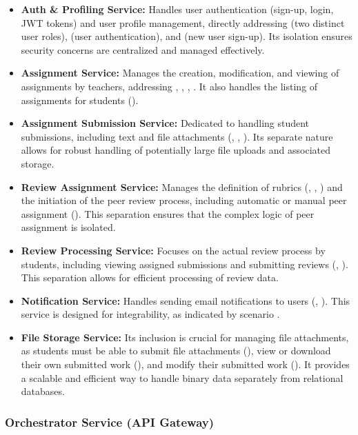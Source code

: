 \begin{itemize}
    \item \textbf{Auth \& Profiling Service:} Handles user authentication (sign-up, login, JWT tokens) and user profile management, directly addressing  (two distinct user roles),  (user authentication), and  (new user sign-up). Its isolation ensures security concerns are centralized and managed effectively.
    \item \textbf{Assignment Service:} Manages the creation, modification, and viewing of assignments by teachers, addressing , , , . It also handles the listing of assignments for students ().
    \item \textbf{Assignment Submission Service:} Dedicated to handling student submissions, including text and file attachments (, , ). Its separate nature allows for robust handling of potentially large file uploads and associated storage.
    \item \textbf{Review Assignment Service:} Manages the definition of rubrics (, , ) and the initiation of the peer review process, including automatic or manual peer assignment (). This separation ensures that the complex logic of peer assignment is isolated.
    \item \textbf{Review Processing Service:} Focuses on the actual review process by students, including viewing assigned submissions and submitting reviews (, ). This separation allows for efficient processing of review data.
    \item \textbf{Notification Service:} Handles sending email notifications to users (, ). This service is designed for integrability, as indicated by scenario .
    \item \textbf{File Storage Service:} Its inclusion is crucial for managing file attachments, as students must be able to submit file attachments (), view or download their own submitted work (), and modify their submitted work (). It provides a scalable and efficient way to handle binary data separately from relational databases.
\end{itemize}

\subsubsection{Orchestrator Service (API Gateway)}

